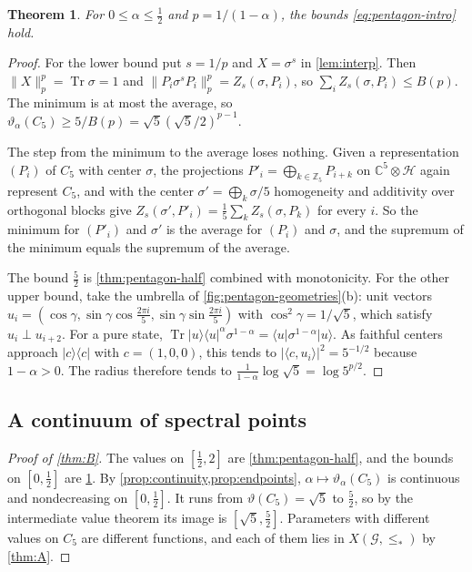 \documentclass[11pt]{article}
\newtheorem{theorem}{Theorem}[section]
\theoremstyle{definition}
\DeclareMathOperator{\Tr}{Tr}
\newcommand{\vt}{\vartheta}
\newcommand{\cH}{\mathcal H}
\newcommand{\cG}{\mathcal G}
\newcommand{\Xs}{X(\cG,\le_*)}
\newcommand{\ket}[1]{\lvert #1\rangle}
\newcommand{\bra}[1]{\langle #1\rvert}
\newcommand{\proj}[1]{\ket{#1}\!\bra{#1}}
\newcommand{\nrm}[1]{\lVert #1\rVert}
\begin{document}
\begin{theorem}\label{thm:pentagon-bounds}
For $0\le\alpha\le\frac12$ and $p=1/(1-\alpha)$, the bounds
\eqref{eq:pentagon-intro} hold.
\end{theorem}

\begin{proof}
For the lower bound put $s=1/p$ and $X=\sigma^s$ in \cref{lem:interp}.  Then
$\nrm X_p^p=\Tr\sigma=1$ and $\nrm{P_i\sigma^sP_i}_p^p=Z_s(\sigma,P_i)$, so
$\sum_iZ_s(\sigma,P_i)\le B(p)$.  The minimum is at most the average, so
$\vt_\alpha(C_5)\ge5/B(p)=\sqrt5(\sqrt5/2)^{p-1}$.

The step from the minimum to the average loses nothing.  Given a
representation $(P_i)$ of $C_5$ with center $\sigma$, the projections
$P'_i=\bigoplus_{k\in\mathbb Z_5}P_{i+k}$ on $\mathbb C^5\otimes\cH$ again
represent $C_5$, and with the center $\sigma'=\bigoplus_k\sigma/5$
homogeneity and additivity over orthogonal blocks give
$Z_s(\sigma',P'_i)=\frac15\sum_kZ_s(\sigma,P_k)$ for every $i$.  So the
minimum for $(P'_i)$ and $\sigma'$ is the average for $(P_i)$ and $\sigma$,
and the supremum of the minimum equals the supremum of the average.

The bound $\frac52$ is \cref{thm:pentagon-half} combined with monotonicity.
For the other upper bound, take the umbrella of
\cref{fig:pentagon-geometries}(b): unit vectors
$u_i=(\cos\gamma,\sin\gamma\cos\frac{2\pi i}5,\sin\gamma\sin\frac{2\pi i}5)$
with $\cos^2\gamma=1/\sqrt5$, which satisfy $u_i\perp u_{i+2}$.  For a pure
state, $\Tr\proj{u}^\alpha\sigma^{1-\alpha}=\bra u\sigma^{1-\alpha}\ket u$.
As faithful centers approach $\proj c$ with $c=(1,0,0)$, this tends to
$|\langle c,u_i\rangle|^2=5^{-1/2}$ because $1-\alpha>0$.  The radius
therefore tends to $\frac{1}{1-\alpha}\log\sqrt5=\log5^{p/2}$.
\end{proof}

\subsection{A continuum of spectral points}

\begin{proof}[Proof of \cref{thm:B}]
The values on $[\frac12,2]$ are \cref{thm:pentagon-half}, and the bounds on
$[0,\frac12]$ are \cref{thm:pentagon-bounds}.  By
\cref{prop:continuity,prop:endpoints}, $\alpha\mapsto\vt_\alpha(C_5)$ is
continuous and nondecreasing on $[0,\frac12]$.  It runs from $\vt(C_5)=\sqrt5$
to $\frac52$, so by the intermediate value theorem its image is
$[\sqrt5,\frac52]$.  Parameters with different values on $C_5$ are different
functions, and each of them lies in $\Xs$ by \cref{thm:A}.
\end{proof}
\end{document}
